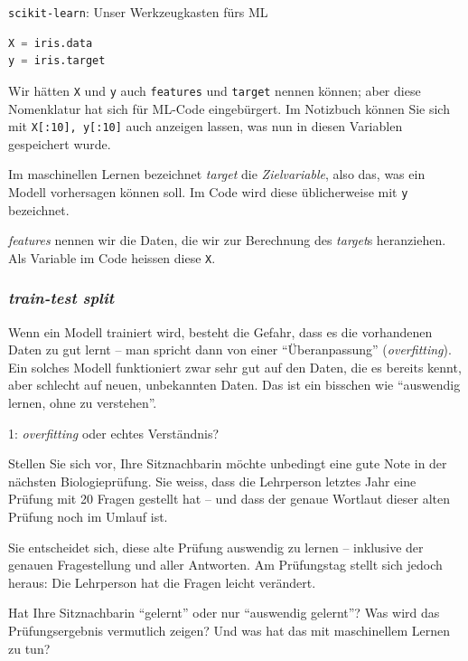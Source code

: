 \begin{lpu}{\texttt{scikit-learn}: Unser Werkzeugkasten fürs ML}
\begin{lstlisting}[language=Python]
X = iris.data
y = iris.target
\end{lstlisting}

Wir hätten \texttt{X} und \texttt{y} auch \texttt{features} und \texttt{target} nennen können; aber diese Nomenklatur hat sich für ML-Code eingebürgert. Im Notizbuch können Sie sich mit \texttt{X[:10], y[:10]} auch anzeigen lassen, was nun in diesen Variablen gespeichert wurde.

\begin{theorie}
    Im maschinellen Lernen bezeichnet \textit{target} die \textit{Zielvariable}, also das, was ein Modell vorhersagen können soll. Im Code wird diese üblicherweise mit \texttt{y} bezeichnet.

    \textit{features} nennen wir die Daten, die wir zur Berechnung des \textit{target}s heranziehen. Als Variable im Code heissen diese \texttt{X}.
\end{theorie}

\subsubsection*{\textit{train-test split}}

Wenn ein Modell trainiert wird, besteht die Gefahr, dass es die vorhandenen Daten zu gut lernt – man spricht dann von einer ``Überanpassung'' (\textit{overfitting}). Ein solches Modell funktioniert zwar sehr gut auf den Daten, die es bereits kennt, aber schlecht auf neuen, unbekannten Daten. Das ist ein bisschen wie ``auswendig lernen, ohne zu verstehen''.

\begin{aufgabe}{1: \textit{overfitting} oder echtes Verständnis?}

Stellen Sie sich vor, Ihre Sitznachbarin möchte unbedingt eine gute Note in der nächsten Biologieprüfung. Sie weiss, dass die Lehrperson letztes Jahr eine Prüfung mit 20 Fragen gestellt hat – und dass der genaue Wortlaut dieser alten Prüfung noch im Umlauf ist.

Sie entscheidet sich, diese alte Prüfung auswendig zu lernen – inklusive der genauen Fragestellung und aller Antworten. Am Prüfungstag stellt sich jedoch heraus: Die Lehrperson hat die Fragen leicht verändert.

Hat Ihre Sitznachbarin ``gelernt'' oder nur ``auswendig gelernt''? Was wird das Prüfungsergebnis vermutlich zeigen? Und was hat das mit maschinellem Lernen zu tun?


\end{aufgabe}
\end{lpu}
